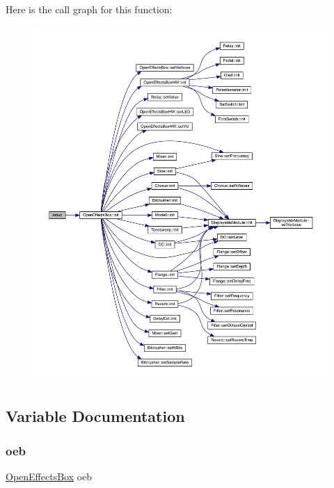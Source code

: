 Here is the call graph for this function\+:\nopagebreak
\begin{figure}[H]
\begin{center}
\leavevmode
\includegraphics[width=350pt]{general_open_effects_box__v4_8ino_a4fc01d736fe50cf5b977f755b675f11d_cgraph}
\end{center}
\end{figure}


\subsection{Variable Documentation}
\mbox{\label{general_open_effects_box__v4_8ino_adce890e5fa7a55c1ce4cd2e3da12afa8}} 
\subsubsection{\texorpdfstring{oeb}{oeb}}
{\footnotesize\ttfamily \mbox{\hyperlink{class_open_effects_box}{Open\+Effects\+Box}} oeb}



